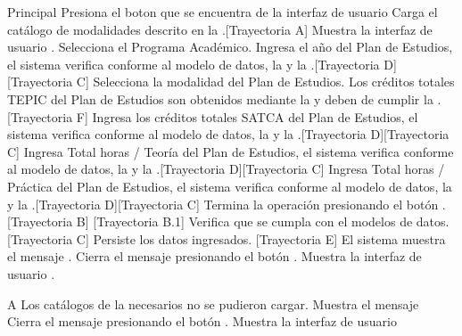 \begin{UCtrayectoria}{Principal}
	\UCpaso[\UCactor] Presiona el boton \IUbutton{+} que se encuentra de la interfaz de usuario 
	\UCpaso Carga el catálogo de modalidades descrito en la .[Trayectoria A]
	\UCpaso Muestra la interfaz de usuario .
	\UCpaso[\UCactor] Selecciona el Programa Académico.
	\UCpaso[\UCactor] Ingresa el año del Plan de Estudios, el sistema verifica conforme al modelo de datos, la  y la .[Trayectoria D][Trayectoria C]
	\UCpaso[\UCactor] Selecciona la modalidad del Plan de Estudios.
	\UCpaso Los créditos totales TEPIC del Plan de Estudios son obtenidos mediante la  y deben de cumplir la .[Trayectoria F]
	\UCpaso[\UCactor] Ingresa los créditos totales SATCA del Plan de Estudios, el sistema verifica conforme al modelo de datos, la  y la .[Trayectoria D][Trayectoria C]
	\UCpaso[\UCactor] Ingresa Total horas / Teoría del Plan de Estudios, el sistema verifica conforme al modelo de datos, la  y la .[Trayectoria D][Trayectoria C]
	\UCpaso[\UCactor] Ingresa Total horas / Práctica del Plan de Estudios, el sistema verifica conforme al modelo de datos, la  y la .[Trayectoria D][Trayectoria C]
	\UCpaso[\UCactor] Termina la operación presionando el botón . [Trayectoria B] [Trayectoria B.1]
	\UCpaso Verifica que se cumpla con el modelos de datos. [Trayectoria C]
	\UCpaso Persiste los datos ingresados. [Trayectoria E]
	\UCpaso El sistema muestra el mensaje .
	\UCpaso[\UCactor] Cierra el mensaje presionando el botón .
	\UCpaso Muestra la interfaz de usuario .
\end{UCtrayectoria}
\begin{UCtrayectoriaA}{A}{ Los catálogos de la  necesarios no se pudieron cargar.}
	\UCpaso Muestra el mensaje 
	\UCpaso[\UCactor] Cierra el mensaje presionando el botón .
	\UCpaso Muestra la interfaz de usuario 
\end{UCtrayectoriaA}

